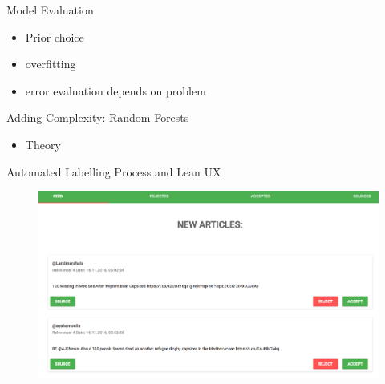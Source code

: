 \documentclass{beamer}
\begin{document}
\begin{frame}{Model Evaluation}

\begin{itemize}
	\item Prior choice  
	\item overfitting  
	\item error evaluation depends on problem 
\end{itemize}
\end{frame}

\begin{frame}{Adding Complexity: Random Forests}

\begin{itemize}
	\item Theory
\end{itemize}
\end{frame}



\begin{frame}{Automated Labelling Process and Lean UX}

\begin{figure}[H]
\centering
\includegraphics[scale=0.25]{UI.png}
\label{heat}
\end{figure}

\href{http://migrantnews-web.s3-website-eu-west-1.amazonaws.com/}{}

\end{frame}
\end{document}

